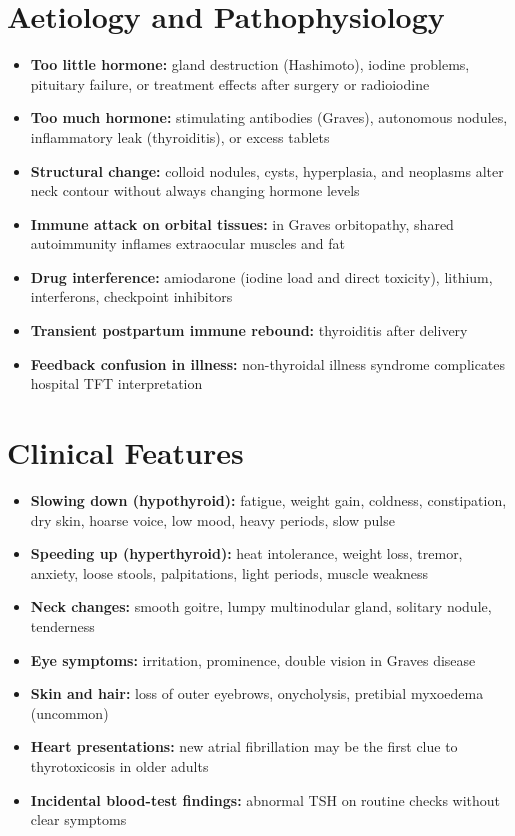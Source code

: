 \section*{Aetiology and Pathophysiology}
\begin{itemize}
    \item \textbf{Too little hormone:} gland destruction (Hashimoto), iodine problems, pituitary failure, or treatment effects after surgery or radioiodine
    \item \textbf{Too much hormone:} stimulating antibodies (Graves), autonomous nodules, inflammatory leak (thyroiditis), or excess tablets
    \item \textbf{Structural change:} colloid nodules, cysts, hyperplasia, and neoplasms alter neck contour without always changing hormone levels
    \item \textbf{Immune attack on orbital tissues:} in Graves orbitopathy, shared autoimmunity inflames extraocular muscles and fat
    \item \textbf{Drug interference:} amiodarone (iodine load and direct toxicity), lithium, interferons, checkpoint inhibitors
    \item \textbf{Transient postpartum immune rebound:} thyroiditis after delivery
    \item \textbf{Feedback confusion in illness:} non-thyroidal illness syndrome complicates hospital TFT interpretation
\end{itemize}

\section*{Clinical Features}
\begin{itemize}
    \item \textbf{Slowing down (hypothyroid):} fatigue, weight gain, coldness, constipation, dry skin, hoarse voice, low mood, heavy periods, slow pulse
    \item \textbf{Speeding up (hyperthyroid):} heat intolerance, weight loss, tremor, anxiety, loose stools, palpitations, light periods, muscle weakness
    \item \textbf{Neck changes:} smooth goitre, lumpy multinodular gland, solitary nodule, tenderness
    \item \textbf{Eye symptoms:} irritation, prominence, double vision in Graves disease
    \item \textbf{Skin and hair:} loss of outer eyebrows, onycholysis, pretibial myxoedema (uncommon)
    \item \textbf{Heart presentations:} new atrial fibrillation may be the first clue to thyrotoxicosis in older adults
    \item \textbf{Incidental blood-test findings:} abnormal TSH on routine checks without clear symptoms
\end{itemize}

